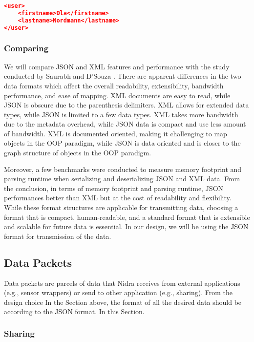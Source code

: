 \begin{lstlisting}[language=json, caption={My Caption}, captionpos=b]
<user>
    <firstname>Ola</firstname>
    <lastname>Nordmann</lastname>
</user>
\end{lstlisting}

\subsubsection{Comparing}

We will compare JSON and XML features and performance with the study conducted by Saurabh and D’Souza \cite{jsonvxml}. There are apparent differences in the two data formats which affect the overall readability, extensibility, bandwidth performance, and ease of mapping. XML documents are easy to read, while JSON is obscure due to the parenthesis delimiters. XML allows for extended data types, while JSON is limited to a few data types. XML takes more bandwidth due to the metadata overhead, while JSON data is compact and use less amount of bandwidth. XML is documented oriented, making it challenging to map objects in the OOP paradigm, while JSON is data oriented and is closer to the graph structure of objects in the OOP paradigm.

Moreover, a few benchmarks were conducted to measure memory footprint and parsing runtime when serializing and deserializing JSON and XML data. From the conclusion,  in terms of memory footprint and parsing runtime, JSON performances better than XML but at the cost of readability and flexibility. While these format structures are applicable for transmitting data, choosing a format that is compact, human-readable, and a standard format that is extensible and scalable for future data is essential. In our design, we will be using the JSON format for transmission of the data.


\subsection{Data Packets}
Data packets are parcels of data that Nidra receives from external applications (e.g., sensor wrappers) or send to other application (e.g., sharing). From the design choice In the Section above, the format of all the desired data should be according to the JSON format.  In this Section.

\subsubsection{Sharing}

